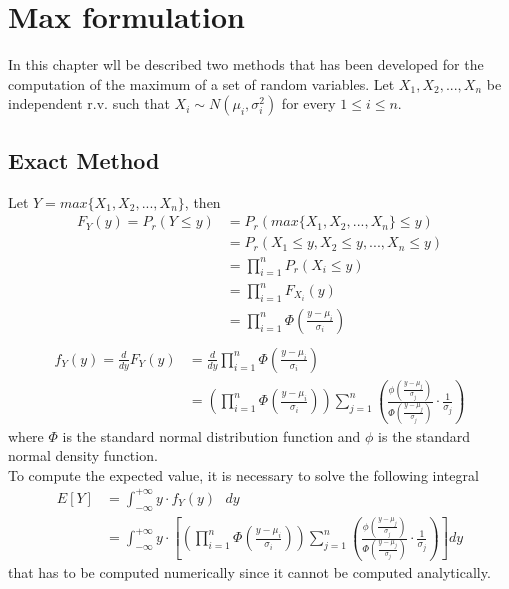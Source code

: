 \section{Max formulation}

In this chapter wll be described two methods that has been developed for the computation of the maximum of a set of random variables.
Let $X_1, X_2, ..., X_n$ be independent r.v. such that $X_i \sim N(\mu_i, \sigma_i^2)$ for every $1 \leq i \leq n.$

\subsection{Exact Method}
Let $Y = max\{X_1, X_2, ..., X_n\}$, then
\begin{align*}
	F_Y(y) = P_r(Y \leq y) &= P_r(max\{X_1, X_2, ..., X_n\} \leq y) \\
	&= P_r(X_1 \leq y, X_2 \leq y, ..., X_n \leq y) \\
	&= \prod_{i = 1}^n P_r(X_i \leq y)  \tag*{(by indipendence of r.v)} \\
	&= \prod_{i = 1}^n F_{X_i}(y)  \\
	&= \prod_{i = 1}^n \Phi\left(\frac{y - \mu_i}{\sigma_i}\right) \\
\end{align*}
\begin{align*}
	f_Y(y) = \frac{d}{dy} F_Y(y) &= \frac{d}{dy} \prod_{i = 1}^n \Phi\left(\frac{y - \mu_i}{\sigma_i}\right) \\
	&= \left(\prod_{i = 1}^n \Phi\left(\frac{y - \mu_i}{\sigma_i}\right)\right) \sum_{j = 1}^n \left(\frac{\phi\left(\frac{y - \mu_j}{\sigma_j}\right)}{\Phi\left(\frac{y - \mu_j}{\sigma_j}\right)} \cdot \frac{1}{\sigma_j}\right)
\end{align*}
where $\Phi$ is the standard normal distribution function and $\phi$ is the standard normal density function. \\
To compute the expected value, it is necessary to solve the following integral
\begin{align*}
	E[Y] &= \int_{-\infty}^{+\infty} y \cdot f_Y(y)\text{ }dy \\
	&= \int_{-\infty}^{+\infty} y \cdot \left[\left(\prod_{i = 1}^n \Phi\left(\frac{y - \mu_i}{\sigma_i}\right)\right) \sum_{j = 1}^n \left(\frac{\phi\left(\frac{y - \mu_j}{\sigma_j}\right)}{\Phi\left(\frac{y - \mu_j}{\sigma_j}\right)} \cdot \frac{1}{\sigma_j}\right)\right]dy
\end{align*}
that has to be computed numerically since it cannot be computed analytically.

